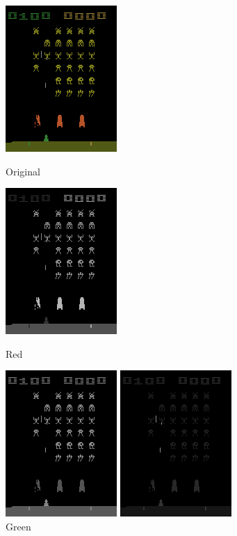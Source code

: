 \begin{figure}[h!]
\centering
\captionsetup{justification=centering}
\begin{multicols}{4}
    \includegraphics[scale=0.7]{figures/methods/separating_colour_spaces_original.png}
    \caption{Original}\par
    \includegraphics[scale=0.7]{figures/methods/separating_colour_spaces_r.png}
    \caption{Red}\par
    \includegraphics[scale=0.7]{figures/methods/separating_colour_spaces_g.png}
    \caption{Green}\par
    \includegraphics[scale=0.7]{figures/methods/separating_colour_spaces_b.png}

\end{multicols}
\end{figure}
